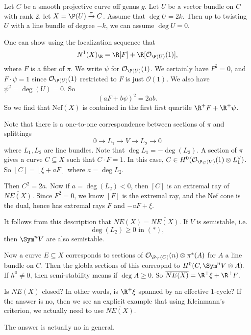 \documentclass[a4paper]{article}
\newcommand\Nef{\mathrm{Nef}}
\begin{document}
\begin{eg}
  Let $C$ be a smooth projective curve off genus $g$. Let $U$ be a vector bundle on $C$ with rank $2$. let $X = \P(U) \overset{\pi}{\to} C$. Assume that $\deg U = 2k$. Then up to twisting $U$ with a line bundle of degree $-k$, we can assume $\deg U = 0$.

  One can show using the localization sequence that %
  \[
    N^1(X)_\R = \R[F] + \R[\mathcal{O}_{\P(U)}(1)],
  \]
  where $F$ is a fiber of $\pi$. We write $\psi$ for $\mathcal{O}_{\P(U)}(1)$. We certainly have $F^2 = 0$, and $F \cdot \psi = 1$ since $\mathcal{O}_{\P(U)}(1)$ restricted to $F$ is just $\mathcal{O}(1)$. We also have $\psi^2 = \deg (U) = 0$. So
  \[
    (aF + b\psi)^2 = 2 ab.
  \]
  So we find that $\Nef(X)$ is contained in the first first quartile $\R^+ F + \R^+ \psi$.

  Note that there is a one-to-one correspondence between sections of $\pi$ and splittings
  \[
    0 \to L_1 \to V \to L_2 \to 0\tag{$*$}
  \]
  where $L_1, L_2$ are line bundles. Note that $\deg L_1 = - \deg (L_2)$. A section of $\pi$ gives a curve $C \subseteq X$ such that $C \cdot F = 1$. In this case, $C \in H^0(\mathcal{O}_{\P_C(V)}(1) \otimes L_1^\vee)$. So $[C] = [\xi + aF]$ where $a = \deg L_2$.

  Then $C^2 = 2a$. Now if $a = \deg (L_2) < 0$, then $[C]$ is an extremal ray of $\overline{NE(X)}$. Since $F^2 = 0$, we know $[F]$ is the extremal ray, and the Nef cone is the dual, hence has extremal rays $F$ and $-aF + \xi$.

  It follows from this description that $NE(X) = \overline{NE(X)}$. If $V$ is semistable, i.e.
  \[
    \deg (L_2) \geq 0\text{ in }(*),
  \]
  then $\Sym^n V$ are also semistable. %

  Now a curve $E \subseteq X$ corresponds to sections of $\mathcal{O}_{\P_V(C)} (n) \otimes \pi^*(A)$ for $A$ a line bundle on $C$. Then the globla sections of this correopnd to $H^0(C, \Sym^n V \otimes A)$. If $h^0 \not= 0$, then semi-stability means if $\deg A \geq 0$. So $\overline{NE(X)} = \R^+ \xi + \R^+ F$.

  Is $NE(X)$ closed? In other words, is $\R^+ \xi$ spanned by an effective $1$-cycle? If the answer is no, then we see an explicit example that using Kleinmann's criterion, we actually need to use $\overline{NE(X)}$.

  The answer is actually no in general.
\end{eg}
\end{document}
